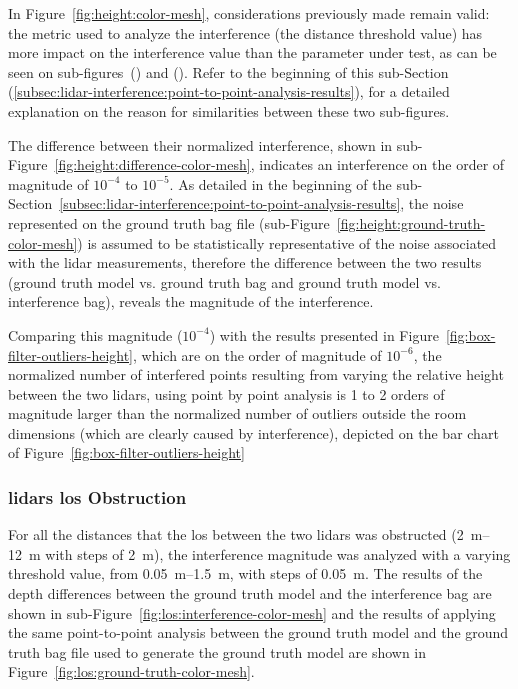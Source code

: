 In Figure~\ref{fig:height:color-mesh}, considerations previously made remain valid: the metric used to analyze the interference (the distance threshold value) has more impact on the interference value than the parameter under test, as can be seen on sub-figures~() and (). Refer to the beginning of this sub-Section (\ref{subsec:lidar-interference:point-to-point-analysis-results}), for a detailed explanation on the reason for similarities between these two sub-figures. 

The difference between their normalized interference, shown in sub-Figure~\ref{fig:height:difference-color-mesh}, indicates an interference on the order of magnitude of $10^{-4}$ to $10^{-5}$. As detailed in the beginning of the sub-Section~\ref{subsec:lidar-interference:point-to-point-analysis-results}, the noise represented on the ground truth bag file (sub-Figure~\ref{fig:height:ground-truth-color-mesh}) is assumed to be statistically representative of the noise associated with the \ac{lidar} measurements, therefore the difference between the two results (ground truth model vs. ground truth bag and ground truth model vs. interference bag), reveals the magnitude of the interference. 

Comparing this magnitude ($10^{-4}$) with the results presented in Figure~\ref{fig:box-filter-outliers-height}, which are on the order of magnitude of $10^{-6}$, the normalized number of interfered points resulting from varying the relative height between the two \acp{lidar}, using point by point analysis is 1 to 2 orders of magnitude larger than the normalized number of outliers outside the room dimensions (which are clearly caused by interference), depicted on the bar chart of Figure~\ref{fig:box-filter-outliers-height}

\subsubsection{\acp{lidar} \acl{los} Obstruction}
For all the distances that the \acf{los} between the two \acp{lidar} was obstructed (\SIrange{2}{12}{\meter} with steps of \SI{2}{\meter}), the interference magnitude was analyzed with a varying threshold value, from \SIrange{0.05}{1.5}{\meter}, with steps of \SI{0.05}{\meter}. The results of the depth differences between the ground truth model and the interference bag are shown in sub-Figure~\ref{fig:los:interference-color-mesh} and the results of applying the same point-to-point analysis between the ground truth model and the ground truth bag file used to generate the ground truth model are shown in Figure~\ref{fig:los:ground-truth-color-mesh}.

